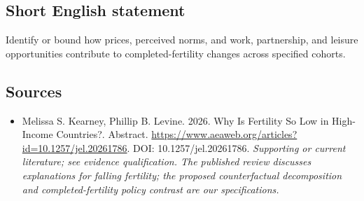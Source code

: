 \documentclass[11pt]{article}
\begin{document}
\subsection{Short English statement}
Identify or bound how prices, perceived norms, and work, partnership, and leisure opportunities contribute to completed-fertility changes across specified cohorts.

\subsection{Sources}
\begin{itemize}\raggedright
\item[\textnormal{[S1]}]\hypertarget{source:30007737:1}{} Melissa S. Kearney, Phillip B. Levine. 2026. Why Is Fertility So Low in High-Income Countries?. Abstract.
\url{https://www.aeaweb.org/articles?id=10.1257/jel.20261786}.
DOI: 10.1257/jel.20261786.
{\small\textit{Supporting or current literature; see evidence qualification. The published review discusses explanations for falling fertility; the proposed counterfactual decomposition and completed-fertility policy contrast are our specifications.}}
\end{itemize}
\end{document}
